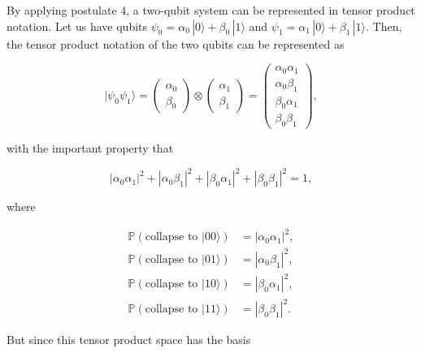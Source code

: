 \documentclass{article}
\theoremstyle{definition}
\begin{document}
    By applying postulate 4, a two-qubit system can be represented in tensor product notation. Let us have qubits $\psi_0 = \alpha_0 \, |0\rangle + \beta_0 \, |1\rangle$ and $\psi_1 = \alpha_1 \, |0\rangle + \beta_1 \, |1\rangle$. Then, the tensor product notation of the two qubits can be represented as

      \[|\psi_0 \psi_1 \rangle = \begin{pmatrix} \alpha_0 \\ \beta_0 \end{pmatrix} \otimes \begin{pmatrix} \alpha_1 \\ \beta_1 \end{pmatrix} = \begin{pmatrix} \alpha_0 \alpha_1 \\ \alpha_0 \beta_1 \\ \beta_0 \alpha_1 \\ \beta_0 \beta_1 \end{pmatrix},\]

    with the important property that

      \[|\alpha_0 \alpha_1|^2 + |\alpha_0 \beta_1|^2 + |\beta_0 \alpha_1|^2 + |\beta_0 \beta_1|^2 = 1,\]

    where

    \begin{align*}
      \mathbb{P}(\text{collapse to } |00\rangle) & = |\alpha_0 \alpha_1|^2, \\
      \mathbb{P}(\text{collapse to } |01\rangle) & = |\alpha_0 \beta_1|^2, \\
      \mathbb{P}(\text{collapse to } |10\rangle) & = |\beta_0 \alpha_1|^2, \\
      \mathbb{P}(\text{collapse to } |11\rangle) & = |\beta_0 \beta_1|^2.
    \end{align*}

    But since this tensor product space has the basis
\end{document}
